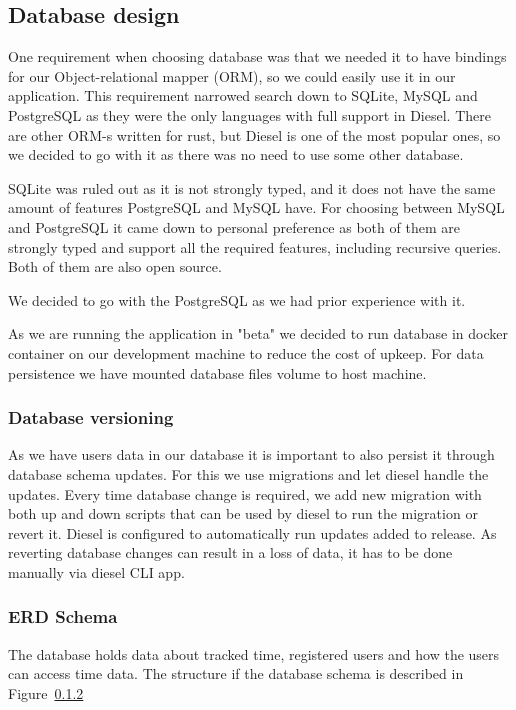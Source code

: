 \subsection{Database design}\label{subsec:database-design}
One requirement when choosing database was that we needed it to have bindings for our Object-relational mapper (ORM),
so we could easily use it in our application.
This requirement narrowed search down to SQLite, MySQL and PostgreSQL as they were the only languages with full support in Diesel.
There are other ORM-s written for rust, but Diesel is one of the most popular ones, so we decided to go with it as
there was no need to use some other database.

SQLite was ruled out as it is not strongly typed, and it does not have the same amount of features PostgreSQL and MySQL have.
For choosing between MySQL and PostgreSQL it came down to personal preference as both of them are strongly typed and
support all the required features, including recursive queries.
Both of them are also open source.

We decided to go with the PostgreSQL as we had prior experience with it.

As we are running the application in "beta" we decided to run database in docker container on our development machine to
reduce the cost of upkeep.
For data persistence we have mounted database files volume to host machine.

\subsubsection{Database versioning}\label{subsubsec:database-versioning}
As we have users data in our database it is important to also persist it through database schema updates.
For this we use migrations and let diesel handle the updates.
Every time database change is required, we add new migration with both up and down scripts that can be used by diesel
to run the migration or revert it.
Diesel is configured to automatically run updates added to release.
As reverting database changes can result in a loss of data, it has to be done manually via diesel CLI app.

\subsubsection{ERD Schema}\label{subsubsec:erd-schema}
The database holds data about tracked time, registered users and how the users can access time data.
The structure if the database schema is described in Figure~\ref{subsubsec:erd-schema}

